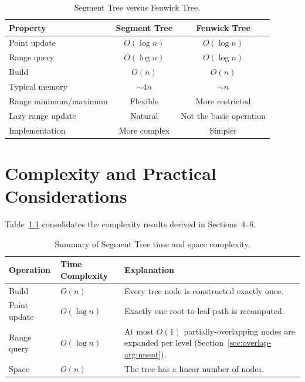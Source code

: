 \documentclass[11pt,open=any]{scrreprt}
\begin{document}
\begin{table}[h]
\centering
\caption{Segment Tree versus Fenwick Tree.}
\label{tab:comparison}
\begin{tabular}{lcc}
\toprule
\textbf{Property} & \textbf{Segment Tree} & \textbf{Fenwick Tree} \\
\midrule
Point update            & $O(\log n)$ & $O(\log n)$ \\
Range query              & $O(\log n)$ & $O(\log n)$ \\
Build                    & $O(n)$      & $O(n)$ \\
Typical memory           & $\sim 4n$   & $\sim n$ \\
Range minimum/maximum    & Flexible    & More restricted \\
Lazy range update        & Natural     & Not the basic operation \\
Implementation           & More complex& Simpler \\
\bottomrule
\end{tabular}
\end{table}

\chapter{Complexity and Practical Considerations}

Table~\ref{tab:summary} consolidates the complexity results derived in Sections~4--6.

\begin{table}[h]
\centering
\caption{Summary of Segment Tree time and space complexity.}
\label{tab:summary}
\begin{tabular}{llp{6.5cm}}
\toprule
\textbf{Operation} & \textbf{Time Complexity} & \textbf{Explanation} \\
\midrule
Build         & $O(n)$      & Every tree node is constructed exactly once. \\
Point update  & $O(\log n)$ & Exactly one root-to-leaf path is recomputed. \\
Range query   & $O(\log n)$ & At most $O(1)$ partially-overlapping nodes are expanded per level (Section~\ref{sec:overlap-argument}). \\
Space         & $O(n)$      & The tree has a linear number of nodes. \\
\bottomrule
\end{tabular}
\end{table}
\end{document}
